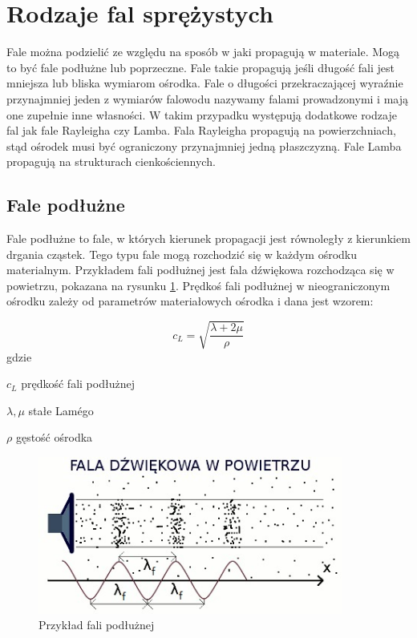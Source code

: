 
\section{Rodzaje fal sprężystych}
\label{sec:rodzaje_fal_sprezystych}

Fale można podzielić ze względu na sposób w jaki propagują w materiale. Mogą to być fale podłużne lub poprzeczne. Fale takie propagują jeśli długość fali jest mniejsza lub bliska wymiarom ośrodka. Fale o długości przekraczającej wyraźnie przynajmniej jeden z wymiarów falowodu nazywamy falami prowadzonymi i mają one zupełnie inne własności. W takim przypadku występują dodatkowe rodzaje fal jak fale Rayleigha czy Lamba. Fala Rayleigha propagują na powierzchniach, stąd ośrodek musi być ograniczony przynajmniej jedną płaszczyzną. Fale Lamba propagują na strukturach cienkościennych.

\subsection{Fale podłużne}

Fale podłużne to fale, w których kierunek propagacji jest równoległy z kierunkiem drgania cząstek. Tego typu fale mogą rozchodzić się w każdym ośrodku materialnym. Przykładem fali podłużnej jest fala dźwiękowa rozchodząca się w powietrzu, pokazana na rysunku \ref{fig:fala_podluzna}. Prędkoś fali podłużnej w nieograniczonym ośrodku zależy od parametrów materiałowych ośrodka i dana jest wzorem:

\begin{equation}
c_L=\sqrt{\frac{\lambda+2\mu}{\rho}}
\end{equation}
gdzie
\begin{eqwhere}[2cm]
        \item[$c_L$] prędkość fali podłużnej
        \item[$\lambda, \mu$] stałe Lam\'{e}go
        \item[$\rho$] gęstość ośrodka
\end{eqwhere}

\begin{figure}[h]
\centering
\includegraphics[width=10cm]{Zdjecia/2/fala_podluzna}
\caption{Przykład fali podłużnej \cite{bartek_fala_podluzna}}
\label{fig:fala_podluzna}
\end{figure}

